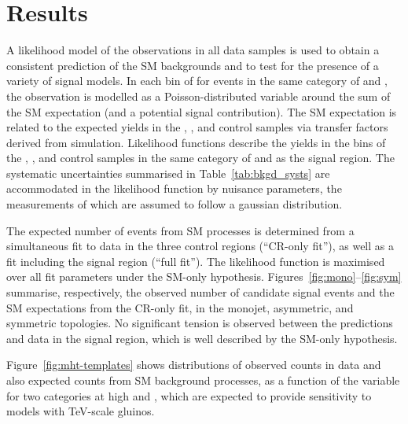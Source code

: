 \section{Results}
\label{sec:results}

A likelihood model of the observations in all data samples is used to
obtain a consistent prediction of the SM backgrounds and to test for
the presence of a variety of signal models.  In each bin of \scalht
for events in the same category of \njet and \nb, the observation is
modelled as a Poisson-distributed variable around the sum of the SM
expectation (and a potential signal contribution). The SM expectation
is related to the expected yields in the \mj, \mmj, and \gj control
samples via transfer factors derived from simulation. Likelihood
functions describe the yields in the \scalht bins of the \mj, \mmj,
and \gj control samples in the same category of \njet and \nb as the
signal region. The systematic uncertainties summarised in
Table~\ref{tab:bkgd_systs} are accommodated in the likelihood function
by nuisance parameters, the measurements of which are assumed to
follow a gaussian distribution. 

The expected number of events from SM processes is determined from a
simultaneous fit to data in the three control regions (``CR-only
fit''), as well as a fit including the signal region (``full
fit''). The likelihood function is maximised over all fit parameters
under the SM-only hypothesis.  Figures~\ref{fig:mono}--\ref{fig:sym}
summarise, respectively, the observed number of candidate signal
events and the SM expectations from the CR-only fit, in the monojet,
asymmetric, and symmetric topologies. No significant tension is
observed between the predictions and data in the signal region, which
is well described by the SM-only hypothesis.

Figure~\ref{fig:mht-templates} shows distributions of observed counts
in data and also expected counts from SM background processes, as a
function of the \mht variable for two \nb categories at high \njet and
\scalht, which are expected to provide sensitivity to models with
TeV-scale gluinos.

